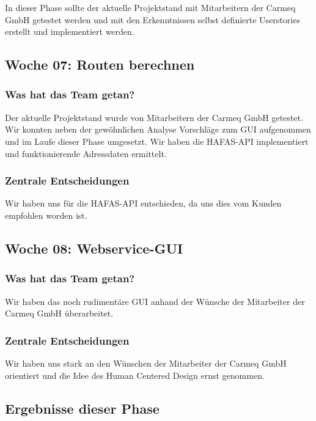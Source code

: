 \documentclass{article}
\begin{document}
In dieser Phase sollte der aktuelle Projektstand mit Mitarbeitern der Carmeq GmbH getestet werden und mit den Erkenntnissen selbst definierte Userstories erstellt und implementiert werden.

\subsection{Woche 07: Routen berechnen}

\subsubsection{Was hat das Team getan?}

Der aktuelle Projektstand wurde von Mitarbeitern der Carmeq GmbH getestet. Wir konnten neben der gew\"ohnlichen Analyse Vorschl\"age zum GUI aufgenommen und im Laufe dieser Phase umgesetzt. Wir haben die HAFAS-API implementiert und funktionierende Adressdaten ermittelt.

\subsubsection{Zentrale Entscheidungen}

Wir haben uns f\"ur die HAFAS-API entschieden, da uns dies vom Kunden empfohlen worden ist.

\subsection{Woche 08: Webservice-GUI}

\subsubsection{Was hat das Team getan?}

Wir haben das noch rudiment\"are GUI anhand der W\"unsche der Mitarbeiter der Carmeq GmbH \"uberarbeitet.

\subsubsection{Zentrale Entscheidungen}

Wir haben uns stark an den W\"unschen der Mitarbeiter der Carmeq GmbH orientiert und die Idee des Human Centered Design ernst genommen.

\subsection{Ergebnisse dieser Phase}
\end{document}
